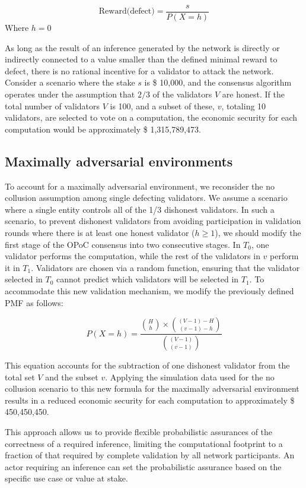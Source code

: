\documentclass{article}
\begin{document}
\[ \text{Reward(defect)} = \frac{s}{P(X = h)} \]
Where \( h = 0 \)

As long as the result of an inference generated by the network is directly or indirectly connected to a value smaller than the defined minimal reward to defect, there is no rational incentive for a validator to attack the network. Consider a scenario where the stake \( s \) is  \$  10,000, and the consensus algorithm operates under the assumption that \( 2/3 \) of the validators \( V \) are honest. If the total number of validators \( V \) is 100, and a subset of these, \( v \), totaling 10 validators, are selected to vote on a computation, the economic security for each computation would be approximately \$ 1,315,789,473. 

\subsection{Maximally adversarial environments}

To account for a maximally adversarial environment, we reconsider the no collusion assumption among single defecting validators. We assume a scenario where a single entity controls all of the 1/3 dishonest validators. In such a scenario, to prevent dishonest validators from avoiding participation in validation rounds where there is at least one honest validator (\(h \geq 1 \)), we should modify the first stage of the OPoC consensus into two consecutive stages. In \( T_0 \), one validator performs the computation, while the rest of the validators in \( v \) perform it in \( T_1 \). Validators are chosen via a random function, ensuring that the validator selected in \( T_0 \) cannot predict which validators will be selected in \( T_1 \). To accommodate this new validation mechanism, we modify the previously defined PMF as follows:

\[ P(X = h) = \frac{{H \choose h} \times {{(V-1)-H} \choose {(v-1)-h}}}{{(V-1) \choose (v-1)}} \]

This equation accounts for the subtraction of one dishonest validator from the total set \( V \) and the subset \( v \). Applying the simulation data used for the no collusion scenario to this new formula for the maximally adversarial environment results in a reduced economic security for each computation to approximately \$ 450,450,450.

This approach allows us to provide flexible probabilistic assurances of the correctness of a required inference, limiting the computational footprint to a fraction of that required by complete validation by all network participants. An actor requiring an inference can set the probabilistic assurance based on the specific use case or value at stake.
\end{document}
